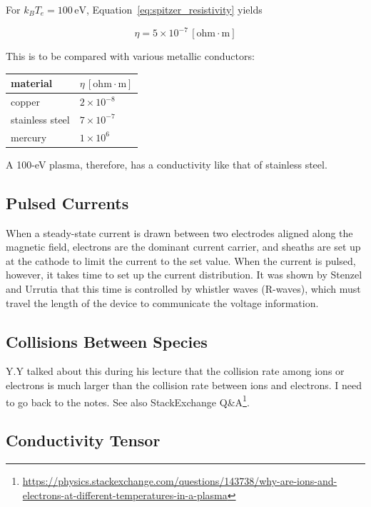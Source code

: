 \documentclass[
  notoc %
]{tufte-book}
\DeclareRobustCommand{\href}[2]{#2\footnote{\url{#1}}}
\begin{document}
For \(k_BT_e=100\, \text{eV}\), Equation~\ref{eq:spitzer_resistivity}
yields

\[
\eta = 5\times 10^{-7}\, [\text{ohm}\cdot\text{m}]
\]

This is to be compared with various metallic conductors:

\begin{longtable}[]{@{}ll@{}}
\toprule
material & \(\eta\, [\text{ohm}\cdot\text{m}]\) \\
\midrule
\endhead
copper & \(2\times10^{-8}\) \\
stainless steel & \(7\times10^{-7}\) \\
mercury & \(1\times10^{6}\) \\
\bottomrule
\end{longtable}

A 100-eV plasma, therefore, has a conductivity like that of stainless
steel.

\hypertarget{pulsed-currents}{%
\subsection{Pulsed Currents}\label{pulsed-currents}}

When a steady-state current is drawn between two electrodes aligned
along the magnetic field, electrons are the dominant current carrier,
and sheaths are set up at the cathode to limit the current to the set
value. When the current is pulsed, however, it takes time to set up the
current distribution. It was shown by Stenzel and Urrutia that this time
is controlled by whistler waves (R-waves), which must travel the length
of the device to communicate the voltage information.

\hypertarget{collisions-between-species}{%
\subsection{Collisions Between
Species}\label{collisions-between-species}}

Y.Y talked about this during his lecture that the collision rate among
ions or electrons is much larger than the collision rate between ions
and electrons. I need to go back to the notes. See also
\href{https://physics.stackexchange.com/questions/143738/why-are-ions-and-electrons-at-different-temperatures-in-a-plasma}{StackExchange
Q\&A}.

\hypertarget{conductivity-tensor}{%
\subsection{Conductivity Tensor}\label{conductivity-tensor}}
\end{document}
